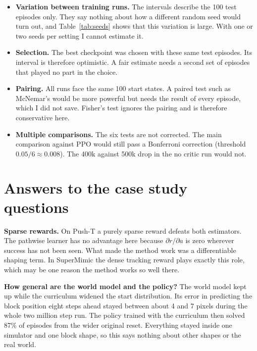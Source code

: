 \documentclass[11pt,a4paper]{article}
\begin{document}
\begin{limitbox}
\begin{itemize}
  \item \textbf{Variation between training runs.} The intervals describe the 100 test episodes only.
        They say nothing about how a different random seed would turn out, and Table~\ref{tab:seeds}
        shows that this variation is large. With one or two seeds per setting I cannot estimate it.
  \item \textbf{Selection.} The best checkpoint was chosen with these same test episodes. Its
        interval is therefore optimistic. A fair estimate needs a second set of episodes that played
        no part in the choice.
  \item \textbf{Pairing.} All runs face the same 100 start states. A paired test such as McNemar's
        would be more powerful but needs the result of every episode, which I did not save. Fisher's
        test ignores the pairing and is therefore conservative here.
  \item \textbf{Multiple comparisons.} The six tests are not corrected. The main comparison against
        PPO would still pass a Bonferroni correction (threshold $0.05/6 \approx 0.008$). The 400k
        against 500k drop in the no critic run would not.
\end{itemize}
\end{limitbox}

\section{Answers to the case study questions}
\label{sec:answers}

\textbf{Sparse rewards.} On Push-T a purely sparse reward defeats both estimators. The pathwise
learner has no advantage here because $\partial r/\partial a$ is zero wherever success has not been
seen. What made the method work was a differentiable shaping term. In SuperMimic the dense tracking
reward plays exactly this role, which may be one reason the method works so well there.

\textbf{How general are the world model and the policy?} The world model kept up while the
curriculum widened the start distribution. Its error in predicting the block position eight steps
ahead stayed between about 4 and 7 pixels during the whole two million step run. The policy trained
with the curriculum then solved 87\% of episodes from the wider original reset. Everything stayed
inside one simulator and one block shape, so this says nothing about other shapes or the real world.
\end{document}
